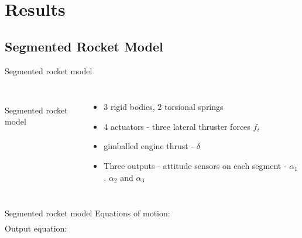 \documentclass{beamer}
\begin{document}
\section{Results}

\subsection{Segmented Rocket Model}

\begin{frame}{Segmented rocket model}
\begin{columns} %
\centering
 \\
Segmented rocket model
\begin{itemize}
\item 3 rigid bodies, 2 torsional springs
\item 4 actuators - three lateral thruster forces $f_i$
\item gimballed engine thrust - $\delta$
\item Three outputs - attitude sensors on each segment - $\alpha_1$, $\alpha_2$ and $\alpha_3$
\end{itemize}
\end{columns}
\end{frame}

\begin{frame}{Segmented rocket model}
Equations of motion:
\begin{multline}

\end{multline}
Output equation:
\begin{equation}

\end{equation}
\end{frame}
\end{document}
